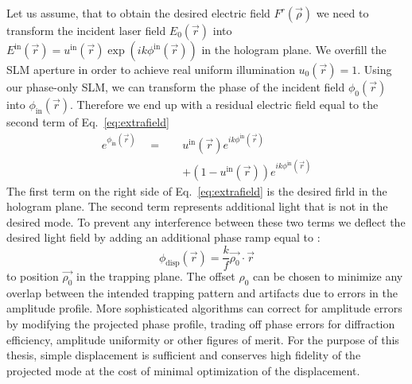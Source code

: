 Let us assume, that to obtain the desired electric field $F^{r}(\vec{\rho})$ we need to transform the incident laser field $E_{0}(\vec{r})$ into $E^{\mathrm{in}}(\vec{r}) = u^{\mathrm{in}}(\vec{r})\exp (ik\phi ^{\mathrm{in}}(\vec{r}))$ in the hologram plane. We overfill the SLM aperture in order to achieve real uniform illumination $u_{0}(\vec{r}) = 1$. Using our phase-only SLM, we can transform the phase of the incident field $\phi _{0}(\vec{r})$ into $\phi _{\mathrm{in}}(\vec{r})$. Therefore we end up with a residual electric field equal to the second term of Eq.~\eqref{eq:extrafield}
\begin{subequations}
\label{eq:extrafield}
\begin{align}
e^{\phi _{\mathrm{in}}(\vec{r})} \quad = \quad & u^{\mathrm{in}}(\vec{r}) e^{ik\phi ^{\mathrm{in}}(\vec{r})} \\
											&  + \left( 1- u^{\mathrm{in}}(\vec{r})\right) e^{ik\phi ^{\mathrm{in}}(\vec{r})}
\end{align}
\end{subequations}
The first term on the right side of Eq.~\eqref{eq:extrafield} is the desired firld in the hologram plane. The second term represents additional light that is not in the desired mode. To prevent any interference between these two terms we deflect the desired light field by adding an additional phase ramp \cite{CURTIS2002169} equal to :
\begin{equation}
\phi _{\mathrm{disp}}(\vec{r}) = \frac{k}{f}\vec{\rho _{0}}\cdot \vec{r}
\end{equation}
to position $\vec{\rho _{0}}$ in the trapping plane. The offset $\rho _{0}$ can be chosen to minimize any overlap between the intended trapping pattern and artifacts due to errors in the amplitude profile. More sophisticated algorithms can correct for amplitude errors by modifying the projected phase profile, trading off phase errors for diffraction efficiency, amplitude uniformity or other figures of merit. For the purpose of this thesis, simple displacement is sufficient and conserves high fidelity of the projected mode at the cost of minimal optimization of the displacement.




